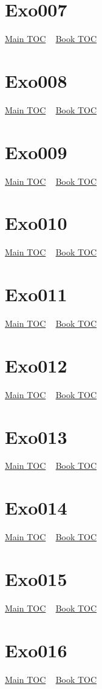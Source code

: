 \documentclass{book}
\begin{document}
  \section{Exo007}\hyperlink{toc}{Main TOC} ~ \hyperref[subsec:Exo]{Book TOC} 
  \section{Exo008}\hyperlink{toc}{Main TOC} ~ \hyperref[subsec:Exo]{Book TOC} 
  \section{Exo009}\hyperlink{toc}{Main TOC} ~ \hyperref[subsec:Exo]{Book TOC} 
  \section{Exo010}\hyperlink{toc}{Main TOC} ~ \hyperref[subsec:Exo]{Book TOC} 
  \section{Exo011}\hyperlink{toc}{Main TOC} ~ \hyperref[subsec:Exo]{Book TOC} 
  \section{Exo012}\hyperlink{toc}{Main TOC} ~ \hyperref[subsec:Exo]{Book TOC} 
  \section{Exo013}\hyperlink{toc}{Main TOC} ~ \hyperref[subsec:Exo]{Book TOC} 
  \section{Exo014}\hyperlink{toc}{Main TOC} ~ \hyperref[subsec:Exo]{Book TOC} 
  \section{Exo015}\hyperlink{toc}{Main TOC} ~ \hyperref[subsec:Exo]{Book TOC} 
  \section{Exo016}\hyperlink{toc}{Main TOC} ~ \hyperref[subsec:Exo]{Book TOC} 
\end{document}
